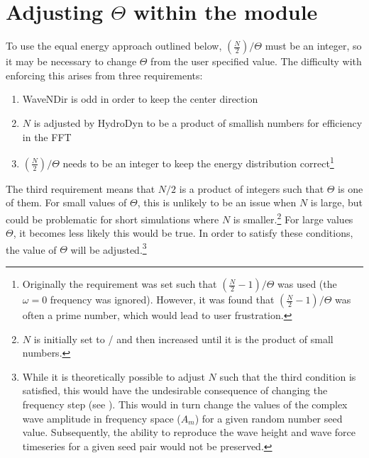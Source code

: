 \section{Adjusting $\Theta$ within the  module}
\label{sec:MultiDir:ThetaAdjust}
To use the equal energy approach outlined below, $(\frac{N}{2}) / \Theta$ must be an integer, so it may be necessary to change $\Theta$ from the user specified value.  The difficulty with enforcing this arises from three requirements:
\begin{enumerate}
   \item{WaveNDir is odd in order to keep the center direction}
   \item{$N$ is adjusted by HydroDyn to be a product of smallish numbers for efficiency in the FFT\label{list:N}}
   \item{$(\frac{N}{2})/\Theta$ needs to be an integer to keep the energy distribution correct\footnote{Originally the requirement was set such that $(\frac{N}{2}-1)/\Theta$ was used (the $\omega=0$ frequency was ignored).  However, it was found that $(\frac{N}{2}-1)/\Theta$ was often a prime number, which would lead to user frustration.}}
\end{enumerate}
The third requirement means that $N/2$ is a product of integers such that $\Theta$ is one of them.  For small values of $\Theta$, this is unlikely to be an issue when $N$ is large, but could be problematic for short simulations where $N$ is smaller.\footnote{$N$ is initially set to / and then increased until it is the product of small numbers.}  For large values $\Theta$, it becomes less likely this would be true.  In order to satisfy these conditions, the value of $\Theta$ will be adjusted.\footnote{While it is theoretically possible to adjust $N$ such that the third condition is satisfied, this would have the undesirable consequence of changing the frequency step (see ).  This would in turn change the values of the complex wave amplitude in frequency space ($A_m$) for a given random number seed value.  Subsequently, the ability to reproduce the wave height and wave force timeseries for a given seed pair would not be preserved.}

